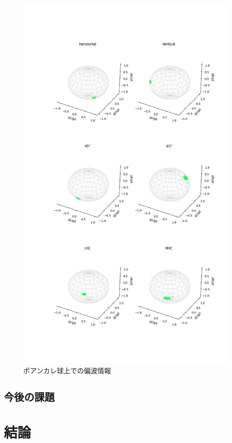 \documentclass[uplatex,a4paper]{jsarticle}
\begin{document}
\begin{figure}[hbtp]
	\centering
	\includegraphics[scale=0.5]{../img/20220707_test_1_PS_2.png}
    \caption{ポアンカレ球上での偏波情報}
	\label{fig:ps}
\end{figure}

\subsection{今後の課題}

\newpage
\section{結論}
\end{document}

